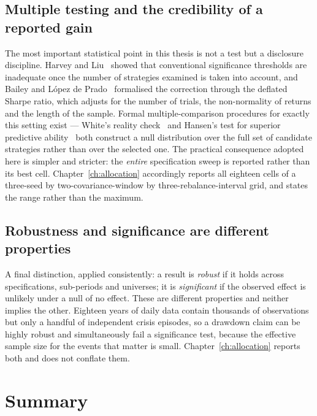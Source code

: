 \subsection{Multiple testing and the credibility of a reported gain}

The most important statistical point in this thesis is not a test but a disclosure discipline.
Harvey and Liu~\cite{harvey2015} showed that conventional significance thresholds are inadequate
once the number of strategies examined is taken into account, and Bailey and López de
Prado~\cite{bailey2014dsr} formalised the correction through the deflated Sharpe ratio, which
adjusts for the number of trials, the non-normality of returns and the length of the sample.
Formal multiple-comparison procedures for exactly this setting exist --- White's reality
check~\cite{white2000} and Hansen's test for superior predictive ability~\cite{hansen2005} both
construct a null distribution over the full set of candidate strategies rather than over the
selected one. The practical consequence adopted here is simpler and stricter: the \emph{entire}
specification sweep is reported rather than its best cell. Chapter~\ref{ch:allocation}
accordingly reports all eighteen cells of a three-seed by two-covariance-window by
three-rebalance-interval grid, and states the range rather than the maximum.

\subsection{Robustness and significance are different properties}

A final distinction, applied consistently: a result is \emph{robust} if it holds across
specifications, sub-periods and universes; it is \emph{significant} if the observed effect is
unlikely under a null of no effect. These are different properties and neither implies the
other. Eighteen years of daily data contain thousands of observations but only a handful of
independent crisis episodes, so a drawdown claim can be highly robust and simultaneously fail a
significance test, because the effective sample size for the events that matter is small.
Chapter~\ref{ch:allocation} reports both and does not conflate them.

\section{Summary}

